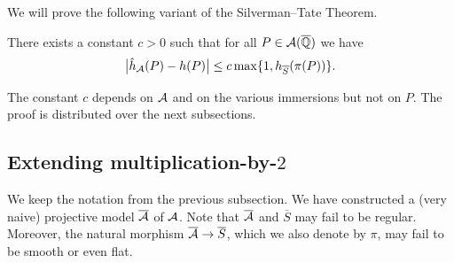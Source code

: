 We will prove the following variant of the Silverman--Tate Theorem.

\begin{theorem}
  \label{thm:silvermantate}
  There exists a constant $c>0$  such that for all 
  $P \in \mathcal{A}({\overline{\mathbb{Q}}})$ we have 
  \begin{equation*}
    \bigl| \hat h_{\mathcal{A}}(P) -
    h(P)\bigr| \le c  \max\{1,h_{\overline
      S}(\pi(P))\}. 
  \end{equation*}
\end{theorem}

The constant $c$ depends on $\mathcal{A}$ and on the various immersions but not on $P$. 
The proof is distributed over  the  next subsections.

\subsection{Extending multiplication-by-$2$}
We keep the notation from the  previous subsection.
We have  constructed a (very naive) projective model $\overline{\mathcal{A}}$ of $\mathcal{A}$.
Note that $\overline{\mathcal{A}}$ and $\overline S$ may fail to be regular.
Moreover, the natural morphism
$\overline{\mathcal{A}}\rightarrow \overline S$, which we also denote by $\pi$,  may fail to be smooth or even
flat.



